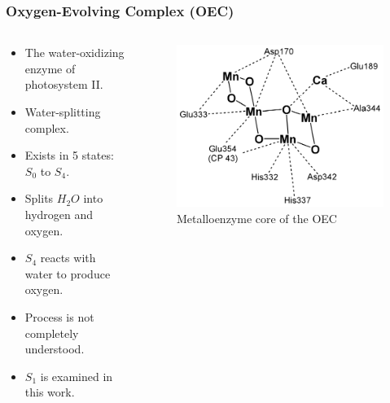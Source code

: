 \documentclass[10pt]{beamer}
\begin{document}
\begin{frame}
	\frametitle{Oxygen-Evolving Complex (OEC)}

	\begin{columns}[T]
		\begin{column}{.5\textwidth}
			\begin{itemize}
				\item The water-oxidizing enzyme of photosystem II.
				\item Water-splitting complex.
				\item Exists in 5 states: $S_{0}$ to $S_{4}$.
				\item Splits $H_{2}O$ into hydrogen and oxygen.
				\item $S_{4}$ reacts with water to produce oxygen.
				\item Process is not completely understood.
				\item $S_{1}$ is examined in this work.
			\end{itemize}
		\end{column}
		\begin{column}{.5\textwidth}
			\begin{figure}
				\caption{Metalloenzyme core of the OEC}
				\includegraphics[width=1.0\textwidth,natwidth=620,natheight=485]{img/oec.png}
			\end{figure}
		\end{column}
	\end{columns}

\end{frame}
\end{document}
